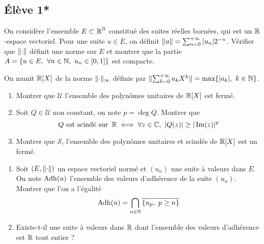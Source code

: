 \documentclass[10pt]{scrartcl}
\title{}
\author{}
\date{}
\begin{document}
    \subsection*{Élève 1*}
    \begin{exo}
        On considère l'ensemble $E\subset \operatorname{\mathbb R}^{\operatorname{\mathbb N}}$ constitué des suites réelles bornées, qui est un $\operatorname{\mathbb R}$-espace vectoriel.
        Pour une suite $u\in E$, on définit $\lVert u\rVert=\sum_{n=0}^{+\infty}|u_n|2^{-n}$. Vérifier que $\lVert \cdot\rVert$ définit une norme sur $E$ 
        et montrer que la partie $A=\lbrace u\in E,\ \forall n\in\N,\ u_n\in[0,1]\rbrace$ est compacte.
    \end{exo}

    \begin{exo}
        On munit $\operatorname{\mathbb R}[X]$ de la norme $\lVert \cdot\rVert_{\infty}$ définie par $\lVert \sum_{k=0}^{+\infty}a_kX^k\rVert=\text{max}\lbrace |a_k|,\ k\in\operatorname{\mathbb N}\rbrace$.
        \begin{enumerate}
            \item Montrer que $\mathcal U$ l'ensemble des polynômes unitaires de $\operatorname{\mathbb R}[X]$ est fermé.
            \item Soit $Q\in\mathcal U$ non constant, on note $p=\deg Q$. Montrer que 
            \[Q\text{ est scindé sur }\operatorname{\mathbb R}\iff \forall z\in\operatorname{\mathbb C},\ |Q(z)|\geq |\operatorname{Im}(z)|^p\]
            \item Montrer que $\mathcal S$, l'ensemble des polynômes unitaires et scindés de $\operatorname{\mathbb R}[X]$ est un fermé.
        \end{enumerate}
    \end{exo}

    \begin{exo}
        \hfill
        \begin{enumerate}
            \item Soit $(E,\lVert \cdot\rVert)$ un espace vectoriel normé et $(u_n)$ une suite à valeurs dans $E$.
            On note $\operatorname{Adh}(u)$ l'ensemble des valeurs d'adhérence de la suite $(u_n)$. Montrer que l'on a l'égalité 
            \[
                \Adh(u)=\bigcap_{n\in\N}\overline{\lbrace u_p,\ p\geq n\rbrace}
            \]
            \item Existe-t-il une suite à valeurs dans $\operatorname{\mathbb R}$ dont l'ensemble des valeurs d'adhérence est $\operatorname{\mathbb R}$ tout entier ?
        \end{enumerate}
    \end{exo}
\end{document}
